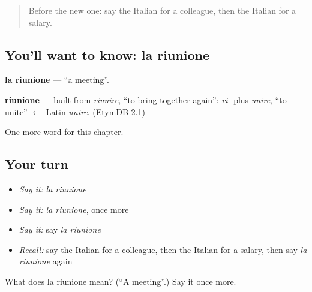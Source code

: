 \begin{quote}
Before the new one: say the Italian for a colleague, then the Italian for a salary.
\end{quote}

\subsection*{You'll want to know: la riunione}
\textbf{la riunione} — \textquotedblleft{}a meeting\textquotedblright{}.

\begin{cousinweb}
\textbf{riunione} — built from \emph{riunire}, \textquotedblleft{}to bring together again\textquotedblright{}: \emph{ri-} plus \emph{unire}, \textquotedblleft{}to unite\textquotedblright{} $\leftarrow$ Latin \emph{unire}. (EtymDB 2.1)
\end{cousinweb}

\begin{grammarlens}[title={What you've built}]
One more word for this chapter.
\end{grammarlens}

\subsection*{Your turn}
\begin{itemize}
\raggedright
  \item \emph{Say it:} \emph{la riunione}
  \item \emph{Say it:} \emph{la riunione}, once more
  \item \emph{Say it:} say \emph{la riunione}
  \item \emph{Recall:} say the Italian for a colleague, then the Italian for a salary, then say \emph{la riunione} again
\end{itemize}

\begin{tcolorbox}[breakable,colback=teal!4,colframe=teal!35!black,title={Before you move on}]
What does la riunione mean? (\textquotedblleft{}A meeting\textquotedblright{}.) Say it once more.
\end{tcolorbox}
